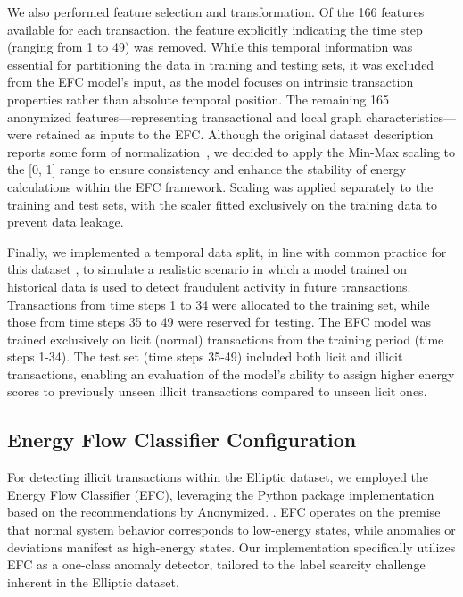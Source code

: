 \documentclass[12pt]{article}
\begin{document}
We also performed feature selection and transformation. Of the 166 features available for each transaction, the feature
explicitly indicating the time step (ranging from 1 to 49) was removed. While this temporal information was essential for
partitioning the data in training and testing sets, it was excluded from the EFC model's input, as the model focuses on
intrinsic transaction properties rather than absolute temporal position. The remaining 165 anonymized features---representing
transactional and local graph characteristics---were retained as inputs to the EFC. Although the original dataset description
reports some form of normalization~\cite{weber2019antimoneylaunderingbitcoinexperimenting}, we decided to apply the Min-Max
scaling to the [0, 1] range to ensure consistency and enhance the stability of energy calculations within the EFC framework.
Scaling was applied separately to the training and test sets, with the scaler fitted exclusively on the training data to
prevent data leakage.

Finally, we implemented a temporal data split, in line with common practice for this dataset 
\cite{weber2019antimoneylaunderingbitcoinexperimenting, lorenz2021machinelearningmethodsdetect}, to simulate a realistic
scenario in which a model trained on historical data is used to detect fraudulent activity in future transactions.
Transactions from time steps 1 to 34 were allocated to the training set, while those from time steps 35 to 49 were reserved
for testing. The EFC model was trained exclusively on licit (normal) transactions from the training period (time steps 1-34).
The test set (time steps 35-49) included both licit and illicit transactions, enabling an evaluation of the model's ability
to assign higher energy scores to previously unseen illicit transactions compared to unseen licit ones.

\subsection{Energy Flow Classifier Configuration} \label{subsec:efc_implementation}

For detecting illicit transactions within the Elliptic dataset, we employed the Energy Flow Classifier (EFC), leveraging
the Python package implementation \cite{efc_package_github} based on the recommendations by Anonymized.
\cite{pontes2019,souza2022novelopensetenergybased}. EFC operates on the premise that normal system behavior corresponds
to low-energy states, while anomalies or deviations manifest as high-energy states. Our implementation specifically
utilizes EFC as a one-class anomaly detector, tailored to the label scarcity challenge inherent in the Elliptic dataset.
\end{document}
